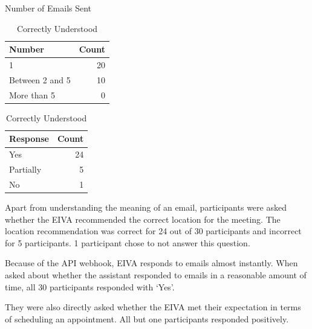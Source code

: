 \documentclass{article}
\begin{document}
\begin{table}[!htb]
	\begin{minipage}{.5\linewidth}
		\caption{Number of Emails Sent}
		\centering
		\begin{tabular}{lr}
			\hline
			\textbf{Number} & \textbf{Count} \\
			\hline
			1               & 20             \\
			Between 2 and 5 & 10             \\
			More than 5     & 0              \\
			\hline
		\end{tabular}
	\end{minipage}%
	\hspace{.1cm}
	\begin{minipage}{.5\linewidth}
		\centering
		\caption{Correctly Understood}
		\begin{tabular}{lr}
			\hline
			\textbf{Response} & \textbf{Count} \\
			\hline
			Yes               & 24             \\
			Partially         & 5              \\
			No                & 1              \\
			\hline
		\end{tabular}
	\end{minipage} 
\end{table}

Apart from understanding the meaning of an email, participants were asked whether the EIVA recommended the correct location for the meeting. The location recommendation was correct for 24 out of 30 participants and incorrect for 5 participants. 1 participant chose to not answer this question.

Because of the API webhook, EIVA responds to emails almost instantly. When asked about whether the assistant responded to emails in a reasonable amount of time, all 30 participants responded with `Yes'.

They were also directly asked whether the EIVA met their expectation in terms of scheduling an appointment. All but one participants responded positively.
\end{document}
